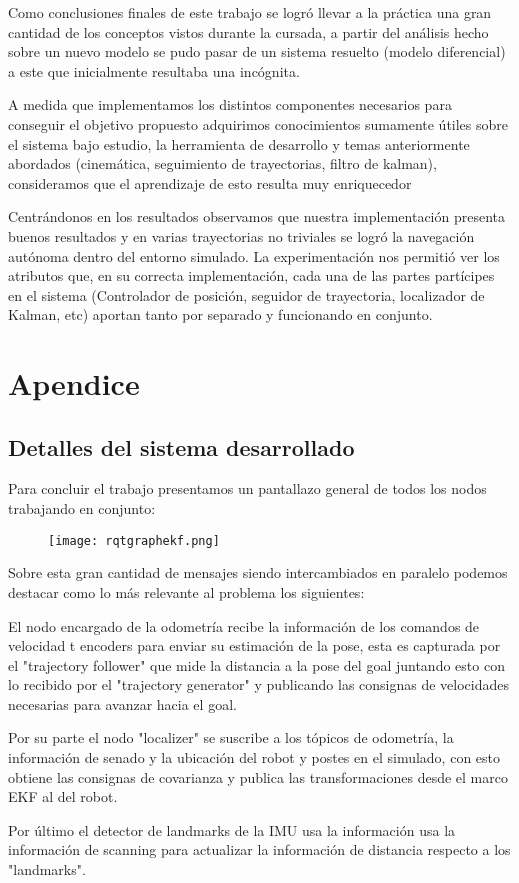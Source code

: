 Como conclusiones finales de este trabajo se logró llevar a la práctica una gran cantidad de los conceptos vistos durante la cursada, a partir del análisis hecho sobre un nuevo modelo se pudo pasar de un sistema resuelto (modelo diferencial) a este que inicialmente resultaba una incógnita. 

A medida que implementamos los distintos componentes necesarios para conseguir el objetivo propuesto adquirimos conocimientos sumamente útiles sobre el sistema bajo estudio, la herramienta de desarrollo y temas anteriormente abordados (cinemática, seguimiento de trayectorias, filtro de kalman), consideramos que el aprendizaje de esto resulta muy enriquecedor 

Centrándonos en los resultados observamos que nuestra implementación presenta buenos resultados y en varias trayectorias no triviales se logró la navegación autónoma dentro del entorno simulado. La experimentación nos permitió ver los atributos que, en su correcta implementación, cada una de las partes partícipes en el sistema (Controlador de posición, seguidor de trayectoria, localizador de Kalman, etc) aportan tanto por separado y funcionando en conjunto.

\pagebreak
\section{Apendice}

\subsection{Detalles del sistema desarrollado}

Para concluir el trabajo presentamos un pantallazo general de todos los nodos trabajando en conjunto:

\begin{figure}[!htb]
\begin{center}
\texttt{[image: rqtgraphekf.png]} 
\end{center}
\end{figure}

Sobre esta gran cantidad de mensajes siendo intercambiados en paralelo podemos destacar como lo más relevante al problema los siguientes:

El nodo encargado de la odometría recibe la información de los comandos de velocidad t encoders para enviar su estimación de la pose, esta es capturada por el "trajectory follower" que mide la distancia a la pose del goal juntando esto con lo recibido por el "trajectory generator" y publicando las consignas de velocidades necesarias para avanzar hacia el goal.

Por su parte el nodo "localizer" se suscribe a los tópicos de odometría, la información de senado y la ubicación del robot y postes en el simulado, con esto obtiene las consignas de covarianza y publica las transformaciones desde el marco EKF al del robot.

Por último el detector de landmarks de la IMU usa la información usa la información de scanning para actualizar la información de distancia respecto a los "landmarks".